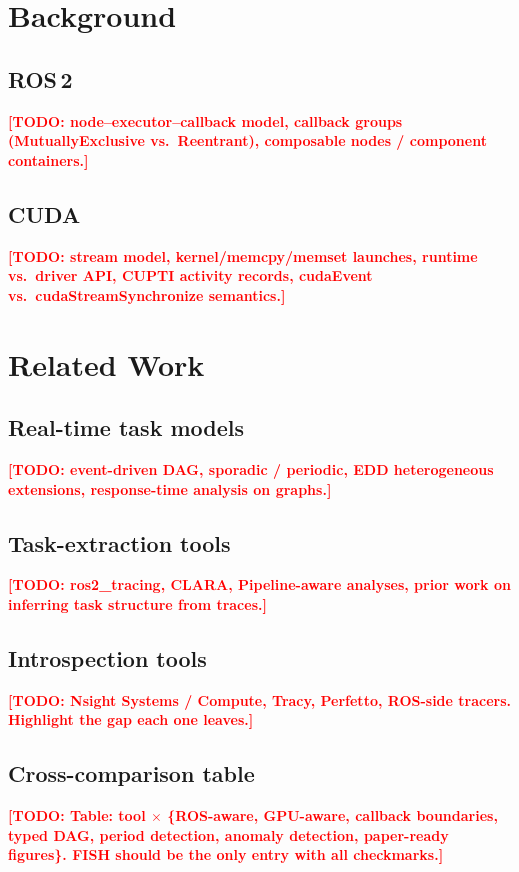 \documentclass[conference]{IEEEtran}
\newcommand{\todoit}[1]{\textcolor{red}{\textbf{[TODO: #1]}}}
\begin{document}
\section{Background}

\subsection{ROS\,2}
\todoit{node--executor--callback model, callback groups
(MutuallyExclusive vs.\ Reentrant), composable nodes /
component containers.}

\subsection{CUDA}
\todoit{stream model, kernel/memcpy/memset launches, runtime vs.\ driver
API, CUPTI activity records, cudaEvent vs.\ cudaStreamSynchronize
semantics.}

\section{Related Work}

\subsection{Real-time task models}
\todoit{event-driven DAG, sporadic / periodic, EDD heterogeneous
extensions, response-time analysis on graphs.}

\subsection{Task-extraction tools}
\todoit{ros2\_tracing, CLARA, Pipeline-aware analyses, prior work on
inferring task structure from traces.}

\subsection{Introspection tools}
\todoit{Nsight Systems / Compute, Tracy, Perfetto, ROS-side tracers.
Highlight the gap each one leaves.}

\subsection{Cross-comparison table}
\todoit{Table: tool $\times$ \{ROS-aware, GPU-aware, callback boundaries,
typed DAG, period detection, anomaly detection, paper-ready figures\}.
FISH should be the only entry with all checkmarks.}
\end{document}
